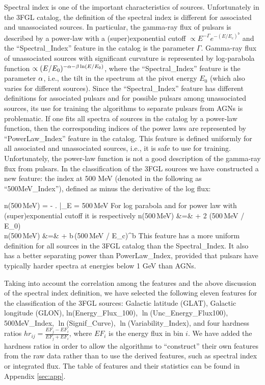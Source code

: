 Spectral index is one of the important characteristics of sources. 
Unfortunately in the 3FGL catalog, the definition of the spectral index is different for associated and unassociated sources.
In particular, the gamma-ray flux of pulsars is described by a power-law with a (super)exponential cutoff $\propto E^{-\Gamma} e^{-(E / E_c)^b}$ and the ``Spectral\_Index'' feature in the catalog is the parameter $\Gamma$.
Gamma-ray flux of unassociated sources with significant curvature is represented by log-parabola function $\propto (E/E_0)^{-\alpha - \beta \ln (E/E_0)}$,
where the ``Spectral\_Index'' feature is the parameter $\alpha$, i.e., the tilt in the spectrum at the pivot energy $E_0$ (which also varies for different sources).
Since the ``Spectral\_Index'' feature has different definitions for associated pulsars and for possible pulsars among unassociated sources,
its use for training the algorithms to separate pulsars from AGNs is problematic.
If one fits all spectra of sources in the catalog by a power-law function, then the corresponding indices of the power laws are represented by
``PowerLaw\_Index'' feature in the catalog.
This feature is defined uniformly for all associated and unassociated sources, i.e., it is safe to use for training.
Unfortunately, the power-law function is not a good description of the gamma-ray flux from pulsars.
In the classification of the 3FGL sources we have constructed a new feature: the index at 500 MeV (denoted in the following as ``500MeV\_Index''), defined as minus the derivative of the log flux:

\be
{}
n({\rm 500\,MeV}) = - \left.  \right|_{E = \rm 500\,MeV}
\ee
For log parabola and for power law with (super)exponential cutoff it is respectively
\beaa
n(\rm 500\,MeV) &=& \al + 2 \bt \ln(\rm 500\,MeV / E_0)    \\
n({\rm 500\,MeV}) &=& \Gamma + b\,({\rm 500\,MeV} / E_c)^b
\eeaa
This feature has a more uniform definition for all sources in the 3FGL catalog than the Spectral\_Index. It also has a better separating power 
than PowerLaw\_Index, provided that pulsars have typically harder spectra at energies below 1 GeV than AGNs.

Taking into account the correlation among the features and the above discussion of the spectral index definition,
we have selected the following eleven features for the classification of the 3FGL sources:
Galactic latitude (GLAT), Galactic longitude (GLON), ln(Energy\_Flux\_100), $\ln$(Unc\_Energy\_Flux100), 500MeV\_Index, $\ln$(Signif\_Curve), 
$\ln$(Variability\_Index), and four hardness ratios $hr_{ij} = \frac{EF_j - EF_i}{EF_j + EF_i}$, where $EF_i$ is the energy flux in bin $i$.
We have added the hardness ratios in order to allow the algorithms to ``construct'' their own features from the raw data rather than to use the 
derived features, such as spectral index or integrated flux.
The table of features and their statistics can be found in Appendix \ref{sec:app}.






